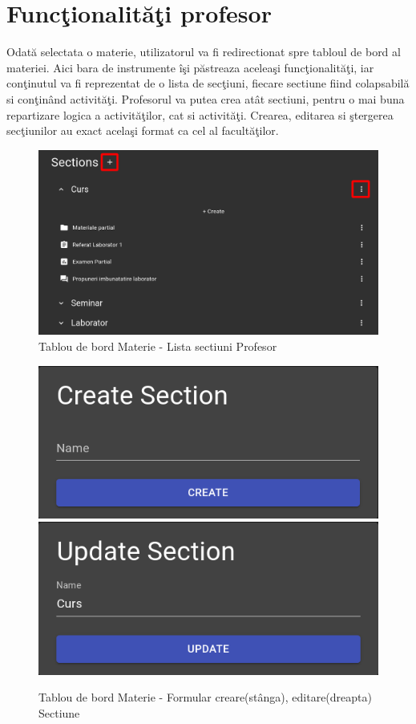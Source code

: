 \documentclass[12pt, a4paper, oneside, romanian]{teza-upb}
\begin{document}
\section{Funcţionalităţi profesor}

Odată selectata o materie, utilizatorul va fi redirectionat spre tabloul de bord al materiei. Aici bara de instrumente îşi păstreaza aceleaşi funcţionalităţi, iar conţinutul va fi reprezentat de o lista de secţiuni, fiecare sectiune fiind colapsabilă si conţinând activităţi. Profesorul va putea crea atât sectiuni, pentru o mai buna repartizare logica a activităţilor, cat si activităţi. Crearea, editarea si ştergerea secţiunilor au exact acelaşi format ca cel al facultăţilor.

\begin{figure}[H]
\centering
\includegraphics*[width=\columnwidth]{tablou-de-bord-materie-lista-sectiuni-profesor}
\caption{Tablou de bord Materie - Lista sectiuni Profesor}
\label{tablou-de-bord-materie-lista-sectiuni-profesor}
\end{figure}

\begin{figure}[H]
\centering
\includegraphics*[width=0.45\columnwidth]{tablou-de-bord-materie-formular-creare-sectiune}
\includegraphics*[width=0.45\columnwidth]{tablou-de-bord-materie-formular-editare-sectiune}
\caption{Tablou de bord Materie - Formular creare(stânga), editare(dreapta) Sectiune}
\label{tablou-de-bord-materie-formular-sectiune}
\end{figure}
\end{document}
